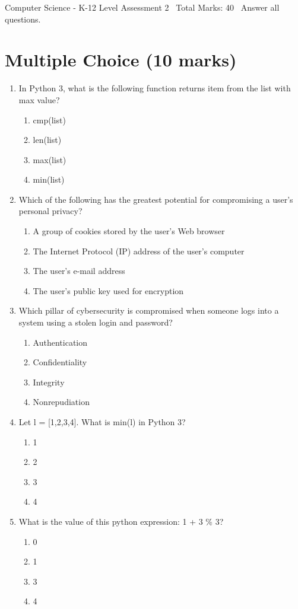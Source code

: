 \documentclass[12pt]{article}
\begin{document}
\begin{center}
Computer Science - K-12 Level Assessment 2 \
Total Marks: 40 \
Answer all questions.
\end{center}

\section*{Multiple Choice (10 marks)}
\begin{enumerate}[label=\arabic*.]
\item In Python 3, what is the following function returns item from the list with max value?
\begin{enumerate}[label=(\alph*)]
    \item cmp(list)
    \item len(list)
    \item max(list)
    \item min(list)
\end{enumerate}
\item Which of the following has the greatest potential for compromising a user's personal privacy?
\begin{enumerate}[label=(\alph*)]
    \item A group of cookies stored by the user's Web browser
    \item The Internet Protocol (IP) address of the user's computer
    \item The user's e-mail address
    \item The user's public key used for encryption
\end{enumerate}
\item Which pillar of cybersecurity is compromised when someone logs into a system using a stolen login and password?
\begin{enumerate}[label=(\alph*)]
    \item Authentication
    \item Confidentiality
    \item Integrity
    \item Nonrepudiation
\end{enumerate}
\item Let l = [1,2,3,4]. What is min(l) in Python 3?
\begin{enumerate}[label=(\alph*)]
    \item 1
    \item 2
    \item 3
    \item 4
\end{enumerate}
\item What is the value of this python expression: 1 + 3 \% 3?
\begin{enumerate}[label=(\alph*)]
    \item 0
    \item 1
    \item 3
    \item 4
\end{enumerate}
\end{enumerate}
\end{document}
